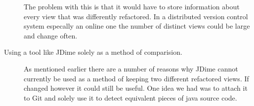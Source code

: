 \begin{description}
    The problem with this is that it would have to store information about every view that was differently refactored.  In a distributed version control system especally an online one the number of distinct views could be large and change often.   
  \item [Using a tool like JDime solely as a method of comparision.]
    As mentioned earlier there are a number of reasons why JDime cannot currently be used as a method of keeping two different refactored views. If changed however it could still be useful.  One idea we had was to attach it to Git and solely use it to detect equivalent pieces of java source code.
\end{description}



% 
% 
% 
% 
% 
% 
% 
% 


